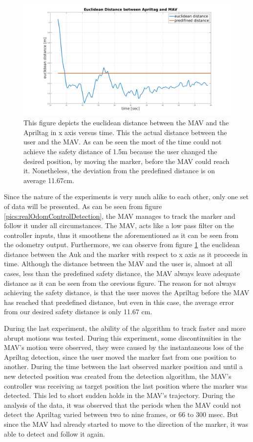 \begin{figure}
	\centering
	 \includegraphics[width=1.00\textwidth]{images/real_euclidean_distance.pdf}
	 \caption{This figure depicts the euclidean distance between the MAV and the Apriltag in x axis versus time. This the actual distance between the user and the MAV. As can be seen the most of the time could not achieve the safety distance of 1.5m because the user changed the desired position, by moving the marker, before the MAV could reach it. Nonetheless, the deviation from the predefined distance is on average 11.67cm.}
	 \label{pics:euclideanDistance}
\end{figure}

Since the nature of the experiments is very much alike to each other, only one set of data will be presented. As can be seen from figure \ref{pics:realOdomControlDetection}, the MAV manages to track the marker and follow it under all circumstances. The MAV, acts like a low pass filter on the controller inputs, thus it smoothens the aforementioned as it can be seen from the odometry output. Furthermore, we can observe from figure \ref{pics:euclideanDistance} the euclidean distance between the Auk and the marker with respect to x axis as it proceeds in time. Although the distance between the MAV and the user is, almost at all cases, less than the predefined safety distance, the MAV always leave adequate distance as it can be seen from the orevious figure. The reason for not always achieving the safety distance, is that the user moves the Apriltag before the MAV has reached that predefined distance, but even in this case, the average error from our desired safety distance is only 11.67 cm.   


During the last experiment, the ability of the algorithm to track faster and more abrupt motions was tested. During this experiment, some discontinuities in the MAV's motion were observed, they were caused by the instantaneous loss of the Apriltag detection, since the user moved the marker fast from one position to another. During the time between the last observed marker position and until a new detected position was created from the detection algorithm, the MAV's controller was receiving as target position the last position where the marker was detected. This led to short sudden holds in the MAV's trajectory. During the analysis of the data, it was observed that the periods when the MAV could not detect the Apriltag varied between two to nine frames, or 66 to 300 msec. But since the MAV had already started to move to the direction of the marker, it was able to detect and follow it again.
 

